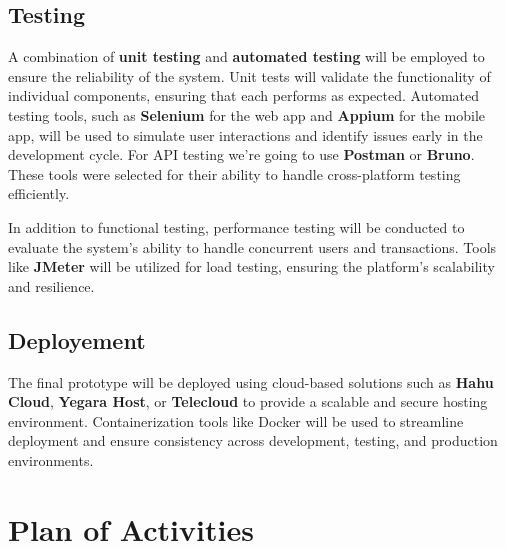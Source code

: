 \documentclass[12pt]{report}
\begin{document}
\subsection{Testing}

A combination of \textbf{unit testing} and \textbf{automated testing} will be employed to ensure the
reliability of the system. Unit tests will validate the functionality of individual components,
ensuring that each performs as expected. Automated testing tools, such as \textbf{Selenium} for the
web app and \textbf{Appium} for the mobile app, will be used to simulate user interactions and
identify issues early in the development cycle. For API testing we’re going to use \textbf{Postman}
or \textbf{Bruno}. These tools were selected for their ability to handle cross-platform testing
efficiently. \cite{c1201} \cite{c1202}

In addition to functional testing, performance testing will be conducted to evaluate the
system’s ability to handle concurrent users and transactions. Tools like \textbf{JMeter} will be
utilized for load testing, ensuring the platform’s scalability and resilience.

\subsection{Deployement}

The final prototype will be deployed using cloud-based solutions such as \textbf{Hahu Cloud},
\textbf{Yegara Host}, or \textbf{Telecloud} to provide a scalable and secure hosting environment. Containerization
tools like Docker will be used to streamline deployment and ensure consistency across
development, testing, and production environments.

\section{Plan of Activities}
\end{document}
